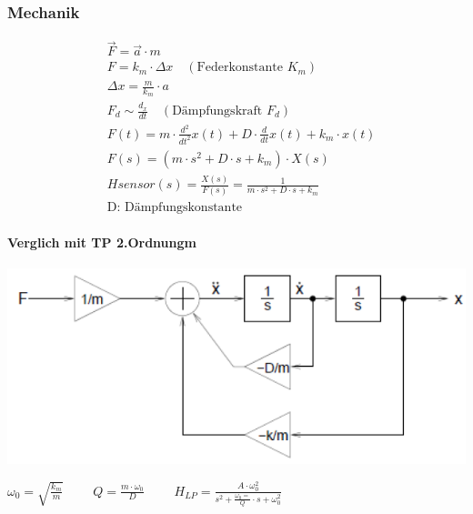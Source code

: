 \subsubsection{Mechanik}
	\begin{minipage}{0.3\textwidth}
      \begin{equation*} 
        \begin{split} 
            &\overrightarrow{F}=\overrightarrow{a} \cdot m\\
            &F=k_m \cdot \Delta x  \quad (\text{Federkonstante } K_m)\\
            &\Delta x=\frac{m}{k_m} \cdot a\\
            &F_d \sim \frac{d_x}{dt} \quad (\text{Dämpfungskraft } F_d)\\
            &F(t)=m\cdot \frac{d^2}{dt^2}x(t)+D \cdot \frac{d}{dt}x(t)+k_m \cdot x(t)\\
            &F(s)=(m \cdot s^2 + D \cdot s + k_m)\cdot X(s) \\
            &H{sensor}(s)=\frac{X(s)}{F(s)}=\frac{1}{m\cdot s^2 + D\cdot s + k_m} \\
            &\text{D: Dämpfungskonstante}
        \end{split} 
      \end{equation*}
    \end{minipage}
    \hfill
    \begin{minipage}{0.6\textwidth}
      \vspace{0pt}
      \paragraph{Verglich mit TP 2.Ordnungm}
      \includegraphics[width=1.0\textwidth]{images/Mech_Regel}  
    
      \begin{minipage}{1.0\textwidth}
        \vspace{0pt}
        \hspace{1cm}
        $\omega _0= \sqrt{\frac{k_m}{m}}$   $ \quad \quad Q=\frac{m\cdot  \omega_0}{D}$
        $\quad \quad H_{LP}= \frac{A \cdot \omega_0 ^2}{s^2 +\frac{\omega _0=}{Q}\cdot s + \omega _0 ^2}$
       \end{minipage}
    \end{minipage}
    

